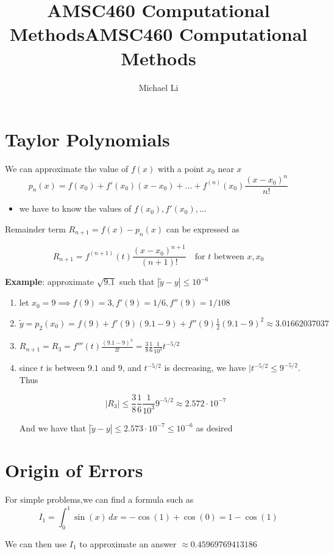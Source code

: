 \documentclass{article}
\date{}
\title{AMSC460 Computational Methods}
\begin{document}
 
  \author{Michael Li}
  \title{AMSC460 Computational Methods}
  \maketitle
  \tableofcontents
  \newpage
  \section{Taylor Polynomials}
  We can approximate the value of $f(x)$ with a point $x_0$ near $x$
  \[p_n(x) = f(x_0) + f'(x_0)(x-x_0) + \ldots + f^{(n)}(x_0) \frac{(x-x_0)^n}{n!}\]
  \begin{itemize}
    \item we have to know the values of $f(x_0), f'(x_0), \ldots$
  \end{itemize}
  Remainder term $R_{n+1} = f(x) - p_n(x)$ can be expressed as

  \[R_{n+1} = f^{(n+1)}(t) \frac{(x - x_0)^{n+1}}{(n+1)!} \quad \text{for $t$ between $x, x_0$}\]

  \textbf{Example}: approximate $\sqrt{9.1}$ such that $|\tilde{y} - y| \leq 10^{-6}$

  \begin{enumerate}
    \item let $x_0 = 9 \implies f(9) = 3, f'(9) = 1/6, f''(9) = 1/108$
    \item $\tilde{y} = p_2(x_0) = f(9) + f'(9)(9.1 - 9) + f''(9) \frac{1}{2} (9.1 - 9)^2 \approx 3.01662037037$
    \item $R_{n+1} = R_3 = f'''(t) \frac{(9.1-9)^3}{3!} = \frac{3}{8} \frac{1}{6} \frac{1}{10^3} t^{-5/2}$
    \item since $t$ is between $9.1$ and $9$, and $t^{-5/2}$ is decreasing, we have $|t^{-5/2} \leq 9^{-5/2}$. Thus

      \[|R_3| \leq \frac{3}{8} \frac{1}{6} \frac{1}{10^3} 9^{-5/2} \approx 2.572 \cdot 10^{-7}\]

      And we have that $|\tilde{y} - y| \leq 2.573 \cdot 10^{-7} \leq 10^{-6}$ as desired
  \end{enumerate}
  \section{Origin of Errors}
  For simple problems,we can find a formula such as
  \[I_1 = \int_0^1 \sin(x) \, dx = -\cos(1) + \cos(0) = 1 - \cos(1)\]

  We can then use $I_1$ to approximate an answer $\approx 0.45969769413186$
\end{document}
